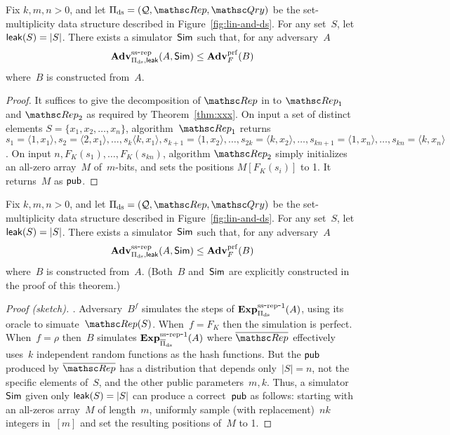 \begin{theorem}\label{thm:ds-ss}
Fix $k,m,n>0$, and let $\Pi_{\mathrm{ds}}= (\calQ,\Rep, \Qry)$ be the set-multiplicity data structure described in Figure~\ref{fig:lin-and-ds}.  For any set~$S$, let ${\sf leak}(S)=|S|$.  There exists a simulator~${\sf Sim}$ such that, for any adversary~$A$
\[
\mathrm{\mathbf{Adv}}^{\mathrm{ss\mbox{-}rep}}_{\Pi_{\mathrm{ds}},{\sf leak}}(A,{\sf Sim}) \leq  \mathbf{Adv}^{\mathrm{prf}}_{F}(B)
\]
where~$B$ is constructed from~$A$.  
\end{theorem}
\begin{proof}
It suffices to give the decomposition of $\Rep$ in to $\Rep_1$ and $\Rep_2$ as required by Theorem~\ref{thm:xxx}.
On input a set of distinct elements $S=\{x_1,x_2,\ldots,x_n\}$, algorithm~$\Rep_1$ returns $s_1=\langle 1,x_1 \rangle, s_2=\langle 2,x_1 \rangle, \ldots, s_k\langle k,x_1\rangle, s_{k+1}=\langle 1,x_2\rangle, \ldots, s_{2k}=\langle k,x_2\rangle, \ldots ,s_{kn+1}=\langle 1,x_n\rangle, \ldots, s_{kn}=\langle k,x_n \rangle$.  On input $n,F_K(s_1),\ldots,F_K(s_{kn})$, algorithm $\Rep_2$ simply initializes an all-zero array~$M$ of~$m$-bits, and sets the positions $M[F_K(s_i)]$ to 1.  It returns~$M$ as ${\sf pub}$.
\end{proof}

\begin{theorem}\label{thm:ds-ss}
Fix $k,m,n>0$, and let $\Pi_{\mathrm{ds}}= (\calQ,\Rep, \Qry)$ be the set-multiplicity data structure described in Figure~\ref{fig:lin-and-ds}.  For any set~$S$, let ${\sf leak}(S)=|S|$.  There exists a simulator~${\sf Sim}$ such that, for any adversary~$A$
\[
\mathrm{\mathbf{Adv}}^{\mathrm{ss\mbox{-}rep}}_{\Pi_{\mathrm{ds}},{\sf leak}}(A,{\sf Sim}) \leq  \mathbf{Adv}^{\mathrm{prf}}_{F}(B)
\]
where~$B$ is constructed from~$A$.  (Both~$B$ and~${\sf Sim}$ are explicitly constructed in the proof of this theorem.)
\end{theorem}
\begin{proof}[Proof (sketch). ] 
Adversary~$B^{f}$ simulates the steps of $\mathrm{\mathbf{Exp}}^{\mathrm{ss\mbox{-}rep\mbox{-}1}}_{\Pi_{\mathrm{ds}}}(A)$, using its oracle to simuate~$\Rep(S)$.  When~$f=F_K$ then the simulation is perfect.  When~$f=\rho$ then~$B$ simulates $\mathrm{\mathbf{Exp}}^{\mathrm{ss\mbox{-}rep\mbox{-}1}}_{\overline{\Pi}_{\mathrm{ds}}}(A)$ where $\overline{\Rep}$ effectively uses~$k$ independent random functions as the hash functions.  But the ${\sf pub}$ produced by $\overline{\Rep}$ has a distribution that depends only~$|S|=n$, not the specific elements of~$S$, and the other public parameters~$m,k$.  Thus, a simulator~${\sf Sim}$ given only ${\sf leak}(S)=|S|$ can produce a correct~${\sf pub}$ as follows: starting with an all-zeros array~$M$ of length~$m$, uniformly sample (with replacement)~$nk$ integers in~$[m]$ and set the resulting positions of~$M$ to 1.
\end{proof}

